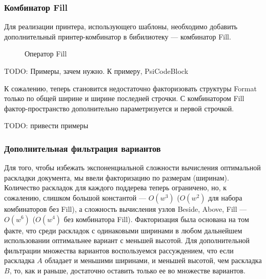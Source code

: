 \subsubsection{Комбинатор Fill}

Для реализации принтера, использующего шаблоны, необходимо добавить
дополнительный принтер-комбинатор в бибилиотеку --- комбинатор Fill.

\begin{figure}[h!]
  \centering
	\quad
	\caption{Оператор Fill}
\end{figure}

TODO: Примеры, зачем нужно. К примеру, PsiCodeBlock

К сожалению, теперь становится недостаточно факторизовать структуры Format
только по общей ширине и ширине последней строчки.
С комбинатором Fill фактор-пространство дополнительно параметризуется и первой
строчкой.

TODO: привести примеры

\subsubsection{Дополнительная фильтрация вариантов}

Для того, чтобы избежать экспоненциальной сложности вычисления оптимальной
раскладки документа, мы ввели факторизацию по размерам (ширинам).
Количество раскладок для каждого поддерева теперь ограничено, но, к сожалению,
слишком большой константой --- $O(w^3)$ ($O(w^2)$ для набора комбинаторов без
Fill), а сложность вычисления узлов Beside, Above, Fill --- $O(w^6)$
($O(w^4)$ без комбинатора Fill). Факторизация была основана на том факте, что
среди раскладок с одинаковыми ширинами в любом дальнейшем использовании
оптимальнее вариант с меньшей высотой. Для дополнительной фильтрации множества
вариантов воспользуемся рассуждением, что если раскладка $A$ обладает и
меньшими ширинами, и меньшей высотой, чем раскладка $B$, то, как и раньше,
достаточно оставить только ее во множестве вариантов.

